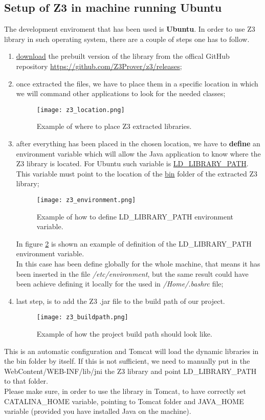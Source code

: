 \subsection{Setup of Z3 in machine running Ubuntu}
The development enviroment that has been used is \textbf{Ubuntu}. In order to use Z3 library in such operating system, there are a couple of steps one has to follow.
\begin{enumerate}
  \item \underline{download} the prebuilt version of the library from the offical GitHub repository \url{https://github.com/Z3Prover/z3/releases};
  \item once extracted the files, we have to place them in a specific location in which we will command other applications to look for the needed classes;
  \begin{figure}[!htb]
     \centering
     \texttt{[image: z3\_location.png]}
     \caption{Example of where to place Z3 extracted libraries.}\label{Fig:Z3Location}
  \end{figure}
  \item after everything has been placed in the chosen location, we have to \textbf{define} an environment variable which will allow the Java application to know where the Z3 library is located. For Ubuntu such variable is \underline{LD\_LIBRARY\_PATH}. This variable must point to the location of the \underline{bin} folder of the extracted Z3 library;
  \begin{figure}[!htb]
     \centering
     \texttt{[image: z3\_environment.png]}
     \caption{Example of how to define LD\_LIBRARY\_PATH environment variable.}\label{Fig:Z3Environment}
  \end{figure}
  In figure \ref{Fig:Z3Environment} is shown an example of definition of the LD\_LIBRARY\_PATH environment variable. \\
  In this case has been define globally for the whole machine, that means it has been inserted in the file \textit{/etc/environment}, but the same result could have been achieve defining it locally for the used in \textit{/Home/.bashrc} file;
  \item last step, is to add the Z3 .jar file to the build path of our project.
  \begin{figure}[!htb]
     \centering
     \texttt{[image: z3\_buildpath.png]}
     \caption{Example of how the project build path should look like.}\label{Fig:Z3BuildPath}
  \end{figure}
\end{enumerate}
This is an automatic configuration and Tomcat will load the dynamic libraries in the bin folder by itself. If this is not sufficient, we need to manually put in the WebContent/WEB-INF/lib/jni the Z3 library and point LD\_LIBRARY\_PATH to that folder.\\
Please make sure, in order to use the library in Tomcat, to have correctly set CATALINA\_HOME variable, pointing to Tomcat folder and JAVA\_HOME variable (provided you have installed Java on the machine).

